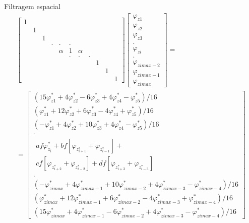 \begin{frame}{Filtragem espacial}
\footnotesize{
\begin{align}
\left[\begin{array}{ccccccccccc}
1 &  & & & & & & & & &\\
 & 1 &  & & & & & & & & \\
& & 1 & & & & & & & &\\
& &  & . & . & .&  &  & & & \\
& & &  & \alpha & 1 & \alpha &  & & &  \\
& & & &  & . & . & . &  & & \\
& & & & &  &  & & 1 & & \\
& & & & &  &  & & & 1 & \\
& & & & &  &  & & &  & 1
\end{array}\right] \left[\begin{array}{c}
\varphi_{z1} \\
\varphi_{z2}  \\
\varphi_{z3}  \\
 . \\
\varphi_{zi}  \\
 . \\
\varphi_{zimax-2} \\
\varphi_{zimax-1} \\
\varphi_{zimax} 
\end{array}\right] = \hspace{1cm} \nonumber\\ 
=\left[\begin{array}{c}
(15\varphi_{z1}^* +  4 \varphi_{z2}^* -  6 \varphi_{z3}^* +  4  \varphi_{z4}^*
 -         \varphi_{z5}^* ) / 16 \\
( \varphi_{z1}^* + 12\varphi_{z2}^*+  6\varphi_{z3}^* -  4 \varphi_{z4}^*
+         \varphi_{z5}^*) / 16\\
 (   - \varphi_{z1}^* +  4\varphi_{z2}^*
+ 10\varphi_{z3}^* +  4\varphi_{z4}^* - \varphi_{z5}^* ) / 16\\
. \\
\begin{gathered}
af \varphi_{z_i}^*+bf\left[\varphi_{z_{i+1}^*}+\varphi_{z_{i-1}^*}\right]+ \\
cf\left[\varphi_{z_{i+2}^*}+\varphi_{z_{i-2}^*}\right]+df\left[\varphi_{z_{i+3}^*}+\varphi_{z_{i-3}^*}\right]
\end{gathered} \\
. \\
( - \varphi_{zimax}^* +  4\varphi_{zimax-1}^* + 10\varphi_{zimax-2}^* +  4\varphi_{zimax-3}^* - \varphi_{zimax-4}^* ) / 16  \\
(\varphi_{zimax}^* + 12\varphi_{zimax-1}^* +  6\varphi_{zimax-2}^* -  4 \varphi_{zimax-3}^* + \varphi_{zimax-4}^*) / 16 \\
(15\varphi_{zimax}^* +  4\varphi_{zimax-1}^* -  6 \varphi_{zimax-2}^* +  4  \varphi_{zimax-3}^* -  \varphi_{zimax-4}^*)/16 \end{array}\right]\label{filtragem_espacial}
\end{align}}
\normalsize
\normalsize
\end{frame}

